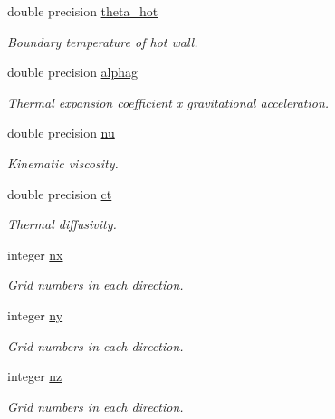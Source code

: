 \begin{DoxyCompactItemize}
double precision \mbox{\hyperlink{namespaceglobal_a63b846fbcd5aedd45f92a0b1eb972244}{theta\+\_\+hot}}
\begin{DoxyCompactList}\small\item\em Boundary temperature of hot wall. \end{DoxyCompactList}\item 
double precision \mbox{\hyperlink{namespaceglobal_abe54a711bf9d8c30a6debfb651bdf47d}{alphag}}
\begin{DoxyCompactList}\small\item\em Thermal expansion coefficient x gravitational acceleration. \end{DoxyCompactList}\item 
double precision \mbox{\hyperlink{namespaceglobal_a48babc9c7f07053917ca1392e7a7b721}{nu}}
\begin{DoxyCompactList}\small\item\em Kinematic viscosity. \end{DoxyCompactList}\item 
double precision \mbox{\hyperlink{namespaceglobal_acf5521de662915885b6a73718cd6314b}{ct}}
\begin{DoxyCompactList}\small\item\em Thermal diffusivity. \end{DoxyCompactList}\end{DoxyCompactItemize}
\textbf{ }\par
\begin{DoxyCompactItemize}
\item 
integer \mbox{\hyperlink{namespaceglobal_a4ba10a6dbbcebb68e0d5e36a6c291898}{nx}}
\begin{DoxyCompactList}\small\item\em Grid numbers in each direction. \end{DoxyCompactList}\item 
integer \mbox{\hyperlink{namespaceglobal_a12dd7ca24c7675f31e6de07b1769991c}{ny}}
\begin{DoxyCompactList}\small\item\em Grid numbers in each direction. \end{DoxyCompactList}\item 
integer \mbox{\hyperlink{namespaceglobal_ab8d7436a6037d4c1b7248107a2f07d76}{nz}}
\begin{DoxyCompactList}\small\item\em Grid numbers in each direction. \end{DoxyCompactList}\end{DoxyCompactItemize}

